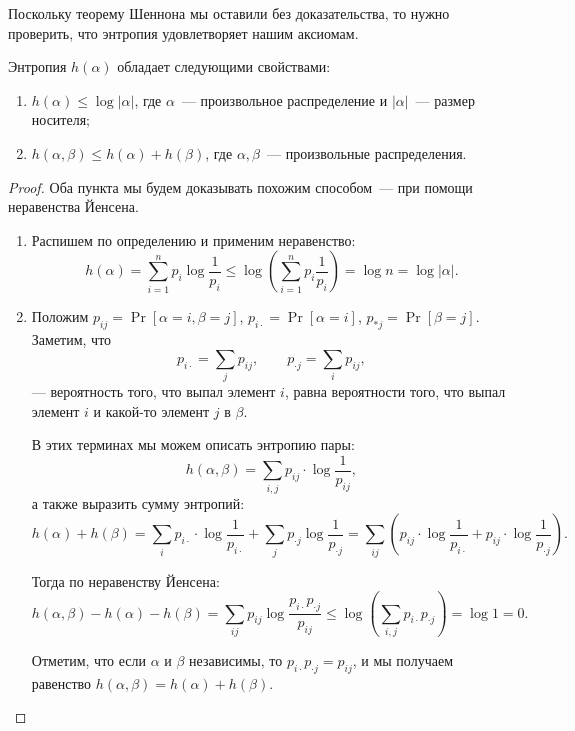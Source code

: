 Поскольку теорему Шеннона мы оставили без доказательства, то нужно проверить, что энтропия удовлетворяет
нашим аксиомам.
\begin{proposition}
    Энтропия $h(\alpha)$ обладает следующими свойствами:
    \begin{enumerate}
        \item $h(\alpha) \le \log |\alpha|$, где $\alpha$~--- произвольное распределение и $|\alpha|$~---
            размер носителя;
        \item $h(\alpha, \beta) \le h(\alpha) + h(\beta)$, где $\alpha, \beta$~--- произвольные распределения.
    \end{enumerate}
\end{proposition}

\begin{proof}
    Оба пункта мы будем доказывать похожим способом~--- при помощи неравенства Йенсена.
    \begin{enumerate}
        \item Распишем по определению и применим неравенство:
            $$
                h(\alpha) = \sum_{i = 1}^n p_i \log \frac{1}{p_i} \le
                \log\left(\sum_{i = 1}^n p_i \frac{1}{p_i} \right) = \log{n}
                = \log |\alpha|.
            $$
        \item Положим $p_{ij} = \Pr[\alpha = i, \beta = j]$, $p_{i \cdot} = \Pr[\alpha = i]$, $p_{*j} =
            \Pr[\beta = j]$. Заметим, что
            $$
                p_{i \cdot} = \sum_{j} p_{ij},\qquad p_{\cdot j} = \sum_{i}p_{ij},
            $$
            --- вероятность того, что выпал элемент $i$, равна вероятности того, что выпал элемент $i$ и
            какой-то элемент $j$ в $\beta$.

            В этих терминах мы можем описать энтропию пары:
            $$
                h(\alpha, \beta) = \sum_{i, j} p_{ij} \cdot \log \frac{1}{p_{ij}},
            $$
            а также выразить сумму энтропий:
            $$
                h(\alpha) + h(\beta) = \sum_i p_{i \cdot} \cdot \log \frac{1}{p_{i \cdot}} +
                \sum_j p_{\cdot j} \log\frac{1}{p_{\cdot j}} =
                \sum_{ij} \left(p_{ij} \cdot \log \frac{1}{p_{i\cdot}} +
                p_{ij} \cdot \log \frac{1}{p_{\cdot j}} \right).
            $$

            Тогда по неравенству Йенсена:
            $$
                h(\alpha, \beta) - h(\alpha) - h(\beta) =
                \sum_{ij} p_{ij} \log \frac{p_{i \cdot} p_{\cdot j}}{p_{ij}} \le
                \log\left( \sum_{i, j} p_{i \cdot} p_{\cdot j} \right) = \log 1 = 0.
            $$

            Отметим, что если $\alpha$ и $\beta$ независимы, то $p_{i \cdot} p_{\cdot j} = p_{ij}$, и мы
            получаем равенство $h(\alpha, \beta) = h(\alpha) + h(\beta)$. 
    \end{enumerate}
\end{proof}

